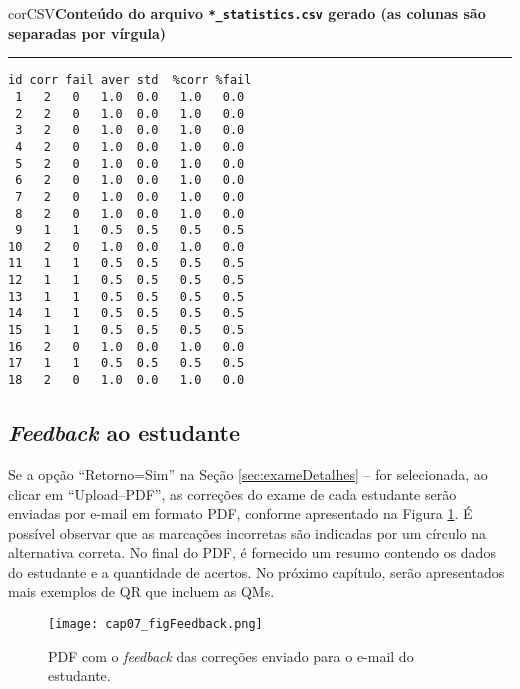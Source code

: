 \begin{myboxCode}{corCSV}{\textbf{Conteúdo do arquivo \texttt{*\_statistics.csv} gerado (as colunas são separadas por vírgula)}}\vspace{3mm}
\hrule
{\footnotesize
\begin{verbatim}
id corr fail aver std  %corr %fail
 1   2   0   1.0  0.0   1.0   0.0
 2   2   0   1.0  0.0   1.0   0.0
 3   2   0   1.0  0.0   1.0   0.0
 4   2   0   1.0  0.0   1.0   0.0
 5   2   0   1.0  0.0   1.0   0.0
 6   2   0   1.0  0.0   1.0   0.0
 7   2   0   1.0  0.0   1.0   0.0
 8   2   0   1.0  0.0   1.0   0.0
 9   1   1   0.5  0.5   0.5   0.5
10   2   0   1.0  0.0   1.0   0.0
11   1   1   0.5  0.5   0.5   0.5
12   1   1   0.5  0.5   0.5   0.5
13   1   1   0.5  0.5   0.5   0.5
14   1   1   0.5  0.5   0.5   0.5
15   1   1   0.5  0.5   0.5   0.5
16   2   0   1.0  0.0   1.0   0.0
17   1   1   0.5  0.5   0.5   0.5
18   2   0   1.0  0.0   1.0   0.0
\end{verbatim}
}
\end{myboxCode}

\subsection{\textit{Feedback} ao estudante}


Se a opção ``Retorno=Sim'' na Seção \ref{sec:exameDetalhes} --  for selecionada, ao clicar em ``Upload--PDF'', as correções do exame de cada estudante serão enviadas por e-mail em formato PDF, conforme apresentado na Figura \ref{fig:cap07_figFeedback}. É possível observar que as marcações incorretas são indicadas por um círculo na alternativa correta. No final do PDF, é fornecido um resumo contendo os dados do estudante e a quantidade de acertos. No próximo capítulo, serão apresentados mais exemplos de QR que incluem as QMs.

\begin{figure}[htbp]
  \centering
  \texttt{[image: cap07\_figFeedback.png]}
    \caption{PDF com o \textit{feedback} das correções enviado para o e-mail do estudante.}
\label{fig:cap07_figFeedback}
\end{figure}


